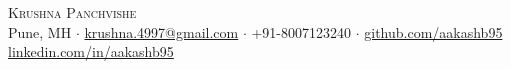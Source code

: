 \documentclass[a4paper]{article}
\begin{document}
\vspace*{-40pt}



\vspace*{-10pt}
\begin{center}
    {\Huge \scshape {Krushna Panchvishe}}\\
    Pune, MH $\cdot$ \href{mailto:krushna.4997@gmail.com}{krushna.4997@gmail.com} $\cdot$ +91-8007123240 $\cdot$ \href{https://github.com/aakashb95}{github.com/aakashb95} \href{http://www.linkedin.com/in/aakashb95}{linkedin.com/in/aakashb95}\\
\end{center}
\end{document}
